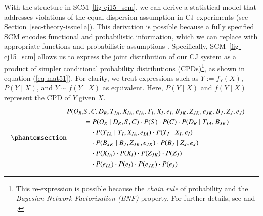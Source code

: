\documentclass[
  authoryear,
  review,
  1p]{elsarticle}
\begin{document}
With the structure in SCM~\ref{fig-cj15_scm}, we can derive a
statistical model that addresses violations of the equal dispersion
assumption in CJ experiments (see Section~\ref{sec-theory-issue1a}).
This derivation is possible because a fully specified SCM encodes
functional and probabilistic information, which we can replace with
appropriate functions and probabilistic assumptions
\citep{Pearl_et_al_2016}. Specifically, SCM~\ref{fig-cj15_scm} allows us
to express the joint distribution of our CJ system as a product of
simpler conditional probability distributions (CPDs)\footnote{This
  re-expression is possible because the \emph{chain rule} of probability
  and the \emph{Bayesian Network Factorization (BNF)} property. For
  further details, see \citet{Pearl_et_al_2016} and \citet{Neal_2020}.},
as shown in equation (\ref{eq-mat51}). For clarity, we treat expressions
such as \(Y := f_{Y}(X)\), \(P(Y \mid X)\), and \(Y \sim f(Y \mid X)\)
as equivalent. Here, \(P(Y \mid X)\) and \(f(Y \mid X)\) represent the
CPD of \(Y\) given \(X\).
\begin{equation}\phantomsection\label{eq-mat51}{
\begin{aligned}
  P(O_{R}, & S, C, D_{R}, T_{IA}, X_{IA}, e_{IA}, T_{I}, X_{I}, e_{I}, B_{JK}, Z_{JK}, e_{JK}, B_{J}, Z_{J}, e_{J} ) & \\
  &= P(O_{R} \mid D_{R}, S, C) \cdot P(S) \cdot P(C) \cdot P(D_{R} \mid T_{IA}, B_{JK}) \\
  & \quad \cdot P(T_{IA} \mid T_{I}, X_{IA}, e_{IA}) \cdot P(T_{I} \mid X_{I}, e_{I}) \\
  & \quad \cdot P(B_{JK} \mid B_{J}, Z_{JK}, e_{JK}) \cdot P(B_{J} \mid Z_{J}, e_{J}) \\
  & \quad \cdot P(X_{IA}) \cdot P(X_{I}) \cdot P(Z_{JK}) \cdot P(Z_{J}) \\
  & \quad \cdot P(e_{IA}) \cdot P(e_{I}) \cdot P(e_{JK}) \cdot P(e_{J})  
\end{aligned}
}\end{equation}
\end{document}
